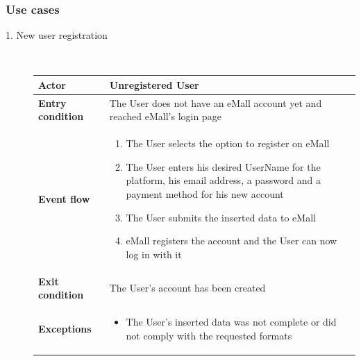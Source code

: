 \documentclass[11pt]{article}
\begin{document}
\subsubsection{Use cases}

\begin{description}
    \item [1. New user registration] \hfill \\
    \begin{table}[H]
        \centering
        \setlength{\tabcolsep}{18pt}
        \renewcommand{\arraystretch}{1.4}
        \begin{tabularx}{\textwidth}{|>{\hsize=0.5\hsize}X|>{\hsize=1.5\hsize}X|}
            \hline
            \textbf{Actor} & Unregistered User \\
            \hline
            \textbf{Entry condition} & The User does not have an eMall account yet and reached eMall's login page \\
            \hline
            \textbf{Event flow} & 
                \begin{minipage}[t]{\hsize}
                \begin{enumerate}[topsep=0pt, leftmargin=*]
                    \item The User selects the option to register on eMall
                    \item The User enters his desired UserName for the platform, his email address, a password and a payment method for his new account
                    \item The User submits the inserted data to eMall
                    \item eMall registers the account and the User can now log in with it
                \end{enumerate}
                \end{minipage}
                \vspace{6pt}
            \\
            \hline
            \textbf{Exit condition} & The User's account has been created \\
            \hline
            \textbf{Exceptions} & 
                \begin{minipage}[t]{\hsize}
                \vspace{0pt}
                \begin{itemize}[topsep=0pt, leftmargin=*]
                    \item The User's inserted data was not complete or did not comply with the requested formats

\end{itemize}
\end{minipage}
\end{tabularx}
\end{table}
\end{description}
\end{document}
